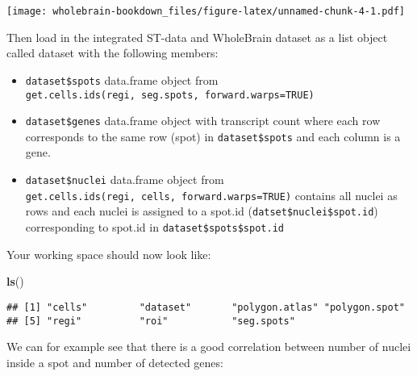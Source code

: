 \documentclass[]{book}
\newenvironment{Shaded}{\begin{snugshade}}{\end{snugshade}}
\newcommand{\KeywordTok}[1]{\textcolor[rgb]{0.13,0.29,0.53}{\textbf{{#1}}}}
\newcommand{\StringTok}[1]{\textcolor[rgb]{0.31,0.60,0.02}{{#1}}}
\newcommand{\CommentTok}[1]{\textcolor[rgb]{0.56,0.35,0.01}{\textit{{#1}}}}
\newcommand{\NormalTok}[1]{{#1}}
\providecommand{\tightlist}{%
  \setlength{\itemsep}{0pt}\setlength{\parskip}{0pt}}
\theoremstyle{definition}
\theoremstyle{definition}
\theoremstyle{remark}
\begin{document}
\texttt{[image: wholebrain-bookdown\_files/figure-latex/unnamed-chunk-4-1.pdf]}

Then load in the integrated ST-data and WholeBrain dataset as a list
object called dataset with the following members:

\begin{itemize}
\tightlist
\item
  \texttt{dataset\$spots} data.frame object from
  \texttt{get.cells.ids(regi,\ seg.spots,\ forward.warps=TRUE)}
\item
  \texttt{dataset\$genes} data.frame object with transcript count where
  each row corresponds to the same row (spot) in \texttt{dataset\$spots}
  and each column is a gene.
\item
  \texttt{dataset\$nuclei} data.frame object from
  \texttt{get.cells.ids(regi,\ cells,\ forward.warps=TRUE)} contains all
  nuclei as rows and each nuclei is assigned to a spot.id
  (\texttt{datset\$nuclei\$spot.id}) corresponding to spot.id in
  \texttt{dataset\$spots\$spot.id}
\end{itemize}

\begin{Shaded}
\end{Shaded}

Your working space should now look like:

\begin{Shaded}
\begin{Highlighting}[]
\KeywordTok{ls}\NormalTok{()}
\end{Highlighting}
\end{Shaded}

\begin{verbatim}
## [1] "cells"         "dataset"       "polygon.atlas" "polygon.spot" 
## [5] "regi"          "roi"           "seg.spots"
\end{verbatim}

We can for example see that there is a good correlation between number
of nuclei inside a spot and number of detected genes:
\end{document}
